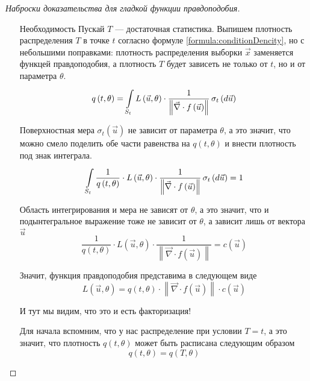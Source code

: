 \begin{proof}[Наброски доказательства для гладкой функции правдоподобия]
\begin{enumerate}
            Условное распределение $\vec{x}$ не зависит от $\theta$
            при известном $T$, что и требовалось доказать для того, чтобы
            показать достаточность факторизации.

        \item[Необходимость]
            Пускай $T$ --- достаточная статистика.
            Выпишем плотность распределения $T$ в точке $t$ согласно формуле
            \eqref{formula:conditionDencity}, но с небольшими поправками:
            плотность распределения выборки $\vec{x}$ заменяется
            функцей правдоподобия, а плотность $T$ будет зависеть не только
            от $t$, но и от параметра $\theta$.
            $$q\left( t, \theta \right)
                = \integrall{S_t}{\sigma_{t}\left(d\vec{u} \right)}{
                    L\left( \vec{u}, \theta \right) \cdot \frac{1}{
                        \left\| \vec{\nabla}
                            \cdot f\left( \vec{u} \right) \right\|}}$$

            Поверхностная мера $\sigma_{t} \left( \vec{u} \right)$ не зависит
            от параметра $\theta$, а это значит, что можно смело поделить
            обе части равенства на $q\left( t, \theta \right)$ и внести
            плотность под знак интеграла.
            $$\integrall{S_t}{\sigma_{t}\left(d\vec{u} \right)}{
                \frac{1}{q\left( t, \theta \right)}
                \cdot L\left( \vec{u}, \theta \right) \cdot \frac{1}{
                    \left\| \vec{\nabla}
                        \cdot f\left( \vec{u} \right) \right\|}} = 1$$

            Область интегрирования и мера не зависят от $\theta$, а это значит,
            что и подынтегральное выражение тоже не зависит от $\theta$,
            а зависит лишь от вектора $\vec{u}$
            $$\frac{1}{q\left( t, \theta \right)}
                \cdot L\left( \vec{u}, \theta \right) \cdot \frac{1}{
                    \left\| \vec{\nabla} \cdot f\left( \vec{u} \right) \right\|}
                = c\left( \vec{u} \right)$$

            Значит, функция правдоподобия представима в следующем виде
            $$L\left( \vec{u}, \theta \right)
                = q\left( t, \theta \right)
                    \cdot \left\| \vec{\nabla}
                        \cdot f\left( \vec{u} \right) \right\|
                        \cdot c\left( \vec{u} \right)$$

            И тут мы видим, что это и есть факторизация!

            Для начала вспомним, что у нас распределение при условии $T=t$,
            а это значит, что плотность $q\left( t, \theta \right)$
            может быть расписана следующим образом
            $$q\left( t, \theta \right)
                = q\left( T, \theta \right)$$


\end{enumerate}
\end{proof}
